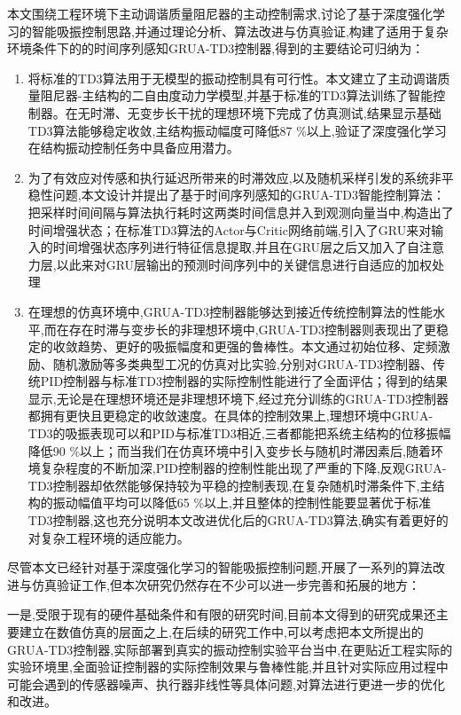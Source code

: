 \documentclass{scrbook}
\begin{document}
{本文围绕工程环境下主动调谐质量阻尼器的主动控制需求,讨论了基于深度强化学习的智能吸振控制思路,并通过理论分析、算法改进与仿真验证,构建了适用于复杂环境条件下的的时间序列感知GRUA-TD3控制器,得到的主要结论可归纳为：
\begin{enumerate}[{(1)}]
\item 将标准的TD3算法用于无模型的振动控制具有可行性。本文建立了主动调谐质量阻尼器-主结构的二自由度动力学模型,并基于标准的TD3算法训练了智能控制器。在无时滞、无变步长干扰的理想环境下完成了仿真测试,结果显示基础TD3算法能够稳定收敛,主结构振动幅度可降低87 \%以上,验证了深度强化学习在结构振动控制任务中具备应用潜力。
\item 为了有效应对传感和执行延迟所带来的时滞效应,以及随机采样引发的系统非平稳性问题,本文设计并提出了基于时间序列感知的GRUA-TD3智能控制算法：把采样时间间隔与算法执行耗时这两类时间信息并入到观测向量当中,构造出了时间增强状态；在标准TD3算法的Actor与Critic网络前端,引入了GRU来对输入的时间增强状态序列进行特征信息提取,并且在GRU层之后又加入了自注意力层,以此来对GRU层输出的预测时间序列中的关键信息进行自适应的加权处理
\item 在理想的仿真环境中,GRUA-TD3控制器能够达到接近传统控制算法的性能水平,而在存在时滞与变步长的非理想环境中,GRUA-TD3控制器则表现出了更稳定的收敛趋势、更好的吸振幅度和更强的鲁棒性。本文通过初始位移、定频激励、随机激励等多类典型工况的仿真对比实验,分别对GRUA-TD3控制器、传统PID控制器与标准TD3控制器的实际控制性能进行了全面评估；得到的结果显示,无论是在理想环境还是非理想环境下,经过充分训练的GRUA-TD3控制器都拥有更快且更稳定的收敛速度。在具体的控制效果上,理想环境中GRUA-TD3的吸振表现可以和PID与标准TD3相近,三者都能把系统主结构的位移振幅降低90 \%以上；而当我们在仿真环境中引入变步长与随机时滞因素后,随着环境复杂程度的不断加深,PID控制器的控制性能出现了严重的下降,反观GRUA-TD3控制器却依然能够保持较为平稳的控制表现,在复杂随机时滞条件下,主结构的振动幅值平均可以降低65 \%以上,并且整体的控制性能要显著优于标准TD3控制器,这也充分说明本文改进优化后的GRUA-TD3算法,确实有着更好的对复杂工程环境的适应能力。
\end{enumerate}
尽管本文已经针对基于深度强化学习的智能吸振控制问题,开展了一系列的算法改进与仿真验证工作,但本次研究仍然存在不少可以进一步完善和拓展的地方：

一是,受限于现有的硬件基础条件和有限的研究时间,目前本文得到的研究成果还主要建立在数值仿真的层面之上,在后续的研究工作中,可以考虑把本文所提出的GRUA-TD3控制器,实际部署到真实的振动控制实验平台当中,在更贴近工程实际的实验环境里,全面验证控制器的实际控制效果与鲁棒性能,并且针对实际应用过程中可能会遇到的传感器噪声、执行器非线性等具体问题,对算法进行更进一步的优化和改进。

}
\end{document}
